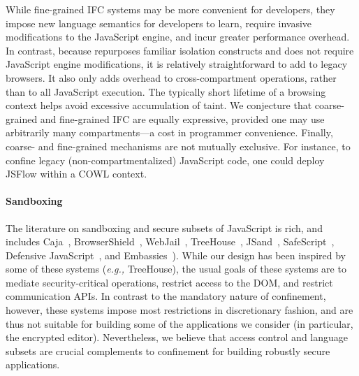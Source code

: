 While fine-grained IFC systems may be more convenient for developers,
they impose new language semantics for developers to learn, require
invasive modifications to the JavaScript engine, and incur greater
performance overhead.
%
In contrast, because \sys{} repurposes familiar isolation constructs
and does not require JavaScript engine modifications, it is relatively
straightforward to add to legacy browsers. It also only adds overhead
to cross-compartment operations, rather than to all JavaScript
execution. The typically short lifetime of a browsing context helps
avoid excessive accumulation of taint.
%
We conjecture that coarse-grained and fine-grained IFC are equally
expressive, provided one may use arbitrarily many compartments---a
cost in programmer convenience.
%
Finally, coarse- and fine-grained mechanisms are not mutually
exclusive. For instance, to confine legacy (non-compartmentalized)
JavaScript code, one could deploy JSFlow within a COWL context.

\paragraph{Sandboxing}
The literature on sandboxing and secure subsets of JavaScript is rich,
and includes Caja~\cite{GoogleCaja}, BrowserShield~\cite{Reis:2007},
WebJail~\cite{VanAcker:2011}, TreeHouse~\cite{Ingram:2012},
JSand~\cite{Agten:2012:JCC}, SafeScript~\cite{SafeScript}, Defensive
JavaScript~\cite{djs}, and Embassies~\cite{Howell:2013}).
%
While our design has been inspired by some of these systems (\emph{e.g.,}
TreeHouse), the usual goals of these systems are to mediate
security-critical operations, restrict access to the DOM, and restrict
communication APIs\@.
%
In contrast to the mandatory nature of confinement, however, these
systems impose most restrictions in discretionary fashion, and are
thus not suitable for building some of the applications we consider
(in particular, the encrypted editor).
%
Nevertheless, we believe that access control and language subsets are
crucial complements to confinement for building robustly secure
applications.

